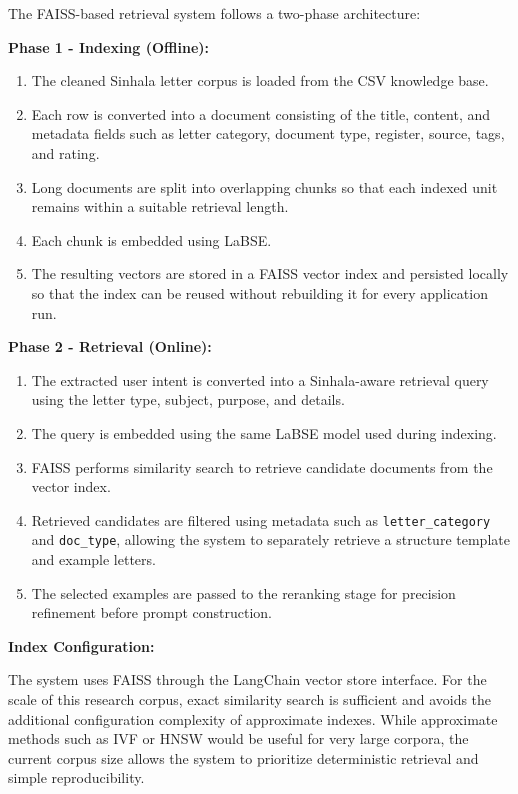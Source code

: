 \documentclass[12pt]{uomthesis}
\begin{document}
The FAISS-based retrieval system follows a two-phase architecture:

\textbf{Phase 1 - Indexing (Offline):}
\begin{enumerate}
    \item The cleaned Sinhala letter corpus is loaded from the CSV knowledge base.
    \item Each row is converted into a document consisting of the title, content, and metadata fields such as letter category, document type, register, source, tags, and rating.
    \item Long documents are split into overlapping chunks so that each indexed unit remains within a suitable retrieval length.
    \item Each chunk is embedded using LaBSE.
    \item The resulting vectors are stored in a FAISS vector index and persisted locally so that the index can be reused without rebuilding it for every application run.
\end{enumerate}

\textbf{Phase 2 - Retrieval (Online):}
\begin{enumerate}
    \item The extracted user intent is converted into a Sinhala-aware retrieval query using the letter type, subject, purpose, and details.
    \item The query is embedded using the same LaBSE model used during indexing.
    \item FAISS performs similarity search to retrieve candidate documents from the vector index.
    \item Retrieved candidates are filtered using metadata such as \texttt{letter\_category} and \texttt{doc\_type}, allowing the system to separately retrieve a structure template and example letters.
    \item The selected examples are passed to the reranking stage for precision refinement before prompt construction.
\end{enumerate}

\textbf{Index Configuration:}

The system uses FAISS through the LangChain vector store interface. For the scale of this research corpus, exact similarity search is sufficient and avoids the additional configuration complexity of approximate indexes. While approximate methods such as IVF or HNSW would be useful for very large corpora, the current corpus size allows the system to prioritize deterministic retrieval and simple reproducibility.
\end{document}
